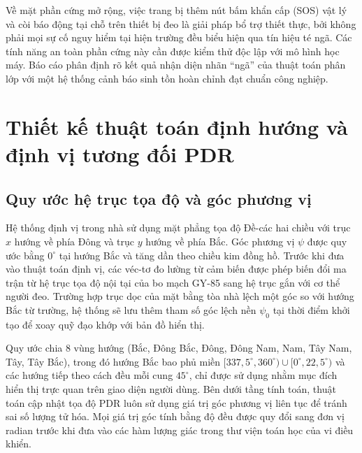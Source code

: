 Về mặt phần cứng mở rộng, việc trang bị thêm nút bấm khẩn cấp (SOS) vật lý và còi báo động tại chỗ trên thiết bị đeo là giải pháp bổ trợ thiết thực, bởi không phải mọi sự cố nguy hiểm tại hiện trường đều biểu hiện qua tín hiệu té ngã. Các tính năng an toàn phần cứng này cần được kiểm thử độc lập với mô hình học máy. Báo cáo phân định rõ kết quả nhận diện nhãn ``ngã'' của thuật toán phân lớp với một hệ thống cảnh báo sinh tồn hoàn chỉnh đạt chuẩn công nghiệp.

\section{Thiết kế thuật toán định hướng và định vị tương đối PDR}\label{sec:pdr}
\subsection{Quy ước hệ trục tọa độ và góc phương vị}
Hệ thống định vị trong nhà sử dụng mặt phẳng tọa độ Đề-các hai chiều với trục $x$ hướng về phía Đông và trục $y$ hướng về phía Bắc. Góc phương vị $\psi$ được quy ước bằng $0^\circ$ tại hướng Bắc và tăng dần theo chiều kim đồng hồ. Trước khi đưa vào thuật toán định vị, các véc-tơ đo lường từ cảm biến được phép biến đổi ma trận từ hệ trục tọa độ nội tại của bo mạch GY-85 sang hệ trục gắn với cơ thể người đeo. Trường hợp trục dọc của mặt bằng tòa nhà lệch một góc so với hướng Bắc từ trường, hệ thống sẽ lưu thêm tham số góc lệch nền $\psi_0$ tại thời điểm khởi tạo để xoay quỹ đạo khớp với bản đồ hiển thị.

Quy ước chia 8 vùng hướng (Bắc, Đông Bắc, Đông, Đông Nam, Nam, Tây Nam, Tây, Tây Bắc), trong đó hướng Bắc bao phủ miền $[337{,}5^\circ,360^\circ)\cup[0^\circ,22{,}5^\circ)$ và các hướng tiếp theo cách đều mỗi cung $45^\circ$, chỉ được sử dụng nhằm mục đích hiển thị trực quan trên giao diện người dùng. Bên dưới tầng tính toán, thuật toán cập nhật tọa độ PDR luôn sử dụng giá trị góc phương vị liên tục để tránh sai số lượng tử hóa. Mọi giá trị góc tính bằng độ đều được quy đổi sang đơn vị radian trước khi đưa vào các hàm lượng giác trong thư viện toán học của vi điều khiển.

